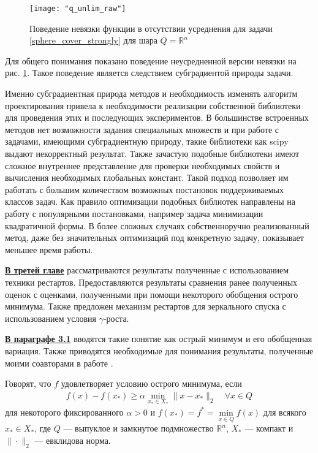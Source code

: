 \begin{figure}[h]
	\centering
	\texttt{[image: "q\_unlim\_raw"]}
    \caption{Поведение невязки функции в отсутствии усреднения для задачи \eqref{sphere_cover_strongly} для шара $Q = \mathbb{R}^n$}
    \label{non_avg}
\end{figure}

Для общего понимания показано поведение неусредненной версии невязки на рис. \ref{non_avg}. Такое поведение является следствием субградиентой природы задачи. 

Именно субградиентная природа методов и необходимость изменять алгоритм проектирования привела к необходимости реализации собственной библиотеки для проведения этих и последующих экспериментов. В большинстве встроенных методов нет возможности задания специальных  множеств и при работе с задачами, имеющими субградиентную природу, такие библиотеки как scipy выдают некорректный результат. Также зачастую подобные библиотеки имеют сложное внутреннее представление для проверки необходимых свойств и вычисления необходимых глобальных констант. Такой подход позволяет им работать с большим количеством возможных постановок поддерживаемых классов задач. Как правило оптимизации подобных библиотек направлены на работу с популярными постановками, например задача минимизации квадратичной формы. В более сложных случаях собственноручно реализованный метод, даже без значительных оптимизаций под конкретную задачу, показывает меньшее время работы. 


\underline{\textbf{В третей главе}} рассматриваются результаты полученные с использованием техники рестартов. Предоставляются результаты сравнения ранее полученных оценок с оценками, полученными при помощи некоторого обобщения острого минимума. Также предложен механизм рестартов для зеркального спуска с использованием условия $\gamma$-роста. 

\underline{\textbf{В параграфе 3.1}} вводятся такие понятие как острый минимум и его обобщенная вариация. Также приводятся необходимые для понимания результаты, полученные моими соавторами в работе \cite{sharp22}. 

Говорят, что $f$ удовлетворяет условию острого минимума, если
\begin{gather}\label{sm}
    f(x) - f(x_*) \geq \alpha \min_{x_* \in X_*} \|x- x_*\|_2 \quad \forall x \in Q
\end{gather}
для некоторого фиксированного $\alpha >0$ и $f(x_*) = f^* = \min\limits_{x\in Q} f(x)$ для всякого $x_* \in X_*$, где $Q$ --- выпуклое и замкнутое подмножество $\mathbb{R}^n$, $X_*$ --- компакт и $\|\cdot\|_2$ --- евклидова норма. 

